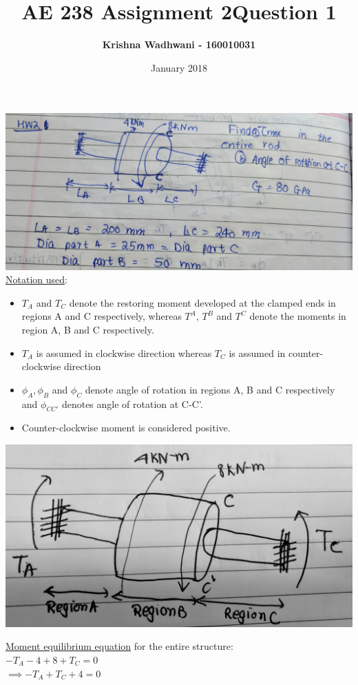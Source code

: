 \documentclass{article}
\title{\Huge \textbf{AE 238 Assignment 2}}
\author{\Huge \textbf{Krishna Wadhwani - 160010031 }}
\date{January 2018}
\begin{document}
\maketitle


\noindent \title{\LARGE \textbf{Question 1}}
\bigbreak

    \includegraphics[scale=0.1]{AE238_A2Q.jpg}
\bigbreak
\noindent \underline{Notation used}: 
\begin{itemize}
\item $T_A$ and $T_C$ denote the restoring moment developed at the clamped ends in regions A and C respectively, whereas $T^A$, $T^B$ and $T^C$ denote the moments in region A, B and C respectively.
\item $T_A$ is assumed in clockwise direction whereas $T_C$ is assumed in counter-clockwise direction
\item $\phi_A, \phi_B$ and $\phi_C$ denote angle of rotation in regions A, B and C respectively and $\phi_{CC'}$ denotes angle of rotation at C-C'.
\item Counter-clockwise moment is considered positive.
\end{itemize} 

\bigbreak
\includegraphics[scale=0.075]{1.jpg}

\noindent \underline{Moment equilibrium equation} for the entire structure: \\
$-T_A-4+8+T_C=0$\\
$\implies -T_A+T_C+4=0$\\
\end{document}
